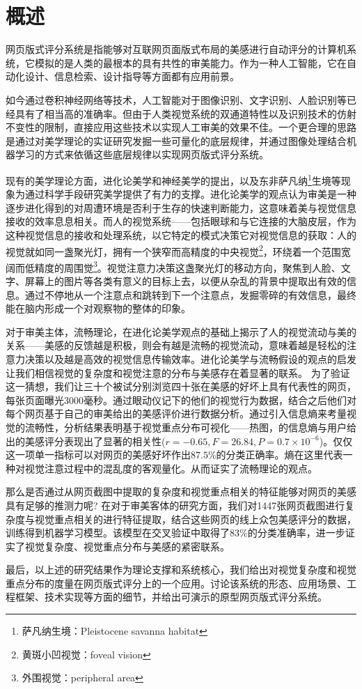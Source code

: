 
\chapter{概述}
\label{chap:introduction}
网页版式评分系统是指能够对互联网页面版式布局的美感进行自动评分的计算机系统，它模拟的是人类的最根本的具有共性的审美能力。作为一种人工智能，它在自动化设计、信息检索、设计指导等方面都有应用前景。

如今通过卷积神经网络等技术，人工智能对于图像识别、文字识别、人脸识别等已经具有了相当高的准确率。但由于人类视觉系统的双通道特性以及识别技术的仿射不变性的限制，直接应用这些技术以实现人工审美的效果不佳。一个更合理的思路是通过对美学理论的实证研究发掘一些可量化的底层规律，并通过图像处理结合机器学习的方式来依循这些底层规律以实现网页版式评分系统。

现有的美学理论方面，进化论美学和神经美学的提出，以及东非萨凡纳\footnote{萨凡纳生境：Pleistocene savanna habitat}生境等现象为通过科学手段研究美学提供了有力的支撑。进化论美学的观点认为审美是一种逐步进化得到的对周遭环境是否利于生存的快速判断能力，这意味着美与视觉信息接收的效率息息相关。而人的视觉系统——包括眼球和与它连接的大脑皮层，作为这种视觉信息的接收和处理系统，以它特定的模式决策它对视觉信息的获取：人的视觉就如同一盏聚光灯，拥有一个狭窄而高精度的中央视觉\footnote{黄斑小凹视觉：foveal vision}，环绕着一个范围宽阔而低精度的周围觉\footnote{外围视觉：peripheral area}。视觉注意力决策这盏聚光灯的移动方向，聚焦到人脸、文字、屏幕上的图片等各类有意义的目标上去，以便从杂乱的背景中提取出有效的信息。通过不停地从一个注意点和跳转到下一个注意点，发掘零碎的有效信息，最终能在脑内形成一个对观察物的整体的印象。

对于审美主体，流畅理论，在进化论美学观点的基础上揭示了人的视觉流动与美的关系——美感的反馈越是积极，则会有越是流畅的视觉流动，意味着越是轻松的注意力决策以及越是高效的视觉信息传输效率。进化论美学与流畅假设的观点的启发让我们相信视觉的复杂度和视觉注意的分布与美感存在着显著的联系。
为了验证这一猜想，我们让三十个被试分别浏览四十张在美感的好坏上具有代表性的网页，每张页面曝光3000毫秒。通过眼动仪记下的他们的视觉行为数据，结合之后他们对每个网页基于自己的审美给出的美感评价进行数据分析。通过引入信息熵来考量视觉的流畅性，分析结果表明基于视觉重点分布可视化——热图，的信息熵与用户给出的美感评分表现出了显著的相关性($r=-0.65, F=26.84, P=0.7\times 10^{-6}$)。仅仅这一项单一指标可以对网页的美感好坏作出$87.5\%$的分类正确率。熵在这里代表一种对视觉注意过程中的混乱度的客观量化。从而证实了流畅理论的观点。

那么是否通过从网页截图中提取的复杂度和视觉重点相关的特征能够对网页的美感具有足够的推测力呢? 在对于审美客体的研究方面，我们对1447张网页截图进行复杂度与视觉重点相关的进行特征提取，结合这些网页的线上众包美感评分的数据，训练得到机器学习模型。该模型在交叉验证中取得了$83\%$的分类准确率，进一步证实了视觉复杂度、视觉重点分布与美感的紧密联系。

最后，以上述的研究结果作为理论支撑和系统核心，我们给出对视觉复杂度和视觉重点分布的度量在网页版式评分上的一个应用。讨论该系统的形态、应用场景、工程框架、技术实现等方面的细节，并给出可演示的原型网页版式评分系统。
